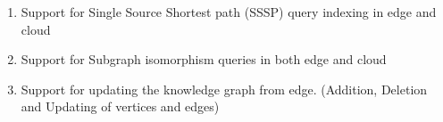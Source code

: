 \documentclass[conference]{IEEEtran}
\begin{document}
\begin{enumerate}
	\item Support for Single Source Shortest path (SSSP) query indexing in edge and cloud
	\item Support for Subgraph isomorphism queries in both edge and cloud
	\item Support for updating the knowledge graph from edge. (Addition, Deletion and Updating of vertices and edges)
\end{enumerate}






\end{document}
